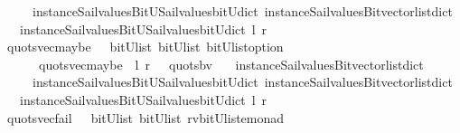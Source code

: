 \begin{isabellebody}
\ \ \ \ \ instance{\isacharunderscore}Sail{}{\isacharunderscore}values{\isacharunderscore}BitU{\isacharunderscore}Sail{}{\isacharunderscore}values{\isacharunderscore}bitU{\isacharunderscore}dict{\isacharparenright}\ {\isacharparenleft}instance{\isacharunderscore}Sail{}{\isacharunderscore}values{\isacharunderscore}Bitvector{\isacharunderscore}list{\isacharunderscore}dict\isanewline
\ \ \ instance{\isacharunderscore}Sail{}{\isacharunderscore}values{\isacharunderscore}BitU{\isacharunderscore}Sail{}{\isacharunderscore}values{\isacharunderscore}bitU{\isacharunderscore}dict{\isacharparenright}\ l\ r{\isacharparenright}{\isacharparenright}{\isachardoublequoteclose}\isanewline
\isanewline
{}\isamarkupfalse%
\ quots{\isacharunderscore}vec{\isacharunderscore}maybe\ \ {\isacharcolon}{\isacharcolon}\ {\isachardoublequoteopen}{\isacharparenleft}bitU{\isacharparenright}list\ {\isasymRightarrow}{\isacharparenleft}bitU{\isacharparenright}list\ {\isasymRightarrow}{\isacharparenleft}{\isacharparenleft}bitU{\isacharparenright}list{\isacharparenright}option\ {\isachardoublequoteclose}\ \ \ \isanewline
\ \ \ \ \ {\isachardoublequoteopen}\ quots{\isacharunderscore}vec{\isacharunderscore}maybe\ \ l\ r\ {\isacharequal}\ {\isacharparenleft}\ quots{\isacharunderscore}bv\ \isanewline
\ \ {\isacharparenleft}instance{\isacharunderscore}Sail{}{\isacharunderscore}values{\isacharunderscore}Bitvector{\isacharunderscore}list{\isacharunderscore}dict\isanewline
\ \ \ \ \ instance{\isacharunderscore}Sail{}{\isacharunderscore}values{\isacharunderscore}BitU{\isacharunderscore}Sail{}{\isacharunderscore}values{\isacharunderscore}bitU{\isacharunderscore}dict{\isacharparenright}\ {\isacharparenleft}instance{\isacharunderscore}Sail{}{\isacharunderscore}values{\isacharunderscore}Bitvector{\isacharunderscore}list{\isacharunderscore}dict\isanewline
\ \ \ instance{\isacharunderscore}Sail{}{\isacharunderscore}values{\isacharunderscore}BitU{\isacharunderscore}Sail{}{\isacharunderscore}values{\isacharunderscore}bitU{\isacharunderscore}dict{\isacharparenright}\ l\ r\ {\isacharparenright}{\isachardoublequoteclose}\isanewline
\isanewline
{}\isamarkupfalse%
\ quots{\isacharunderscore}vec{\isacharunderscore}fail\ \ {\isacharcolon}{\isacharcolon}\ {\isachardoublequoteopen}{\isacharparenleft}bitU{\isacharparenright}list\ {\isasymRightarrow}{\isacharparenleft}bitU{\isacharparenright}list\ {\isasymRightarrow}{\isacharparenleft}{\isacharprime}rv{\isacharcomma}{\isacharparenleft}{\isacharparenleft}bitU{\isacharparenright}list{\isacharparenright}{\isacharcomma}{\isacharprime}e{\isacharparenright}monad\ {\isachardoublequoteclose}\ \ \ \isanewline

\end{isabellebody}
